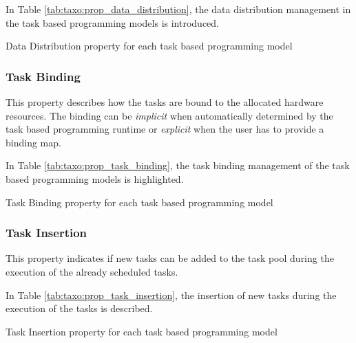 In Table \ref{tab:taxo:prop_data_distribution}, the data distribution management in the task based programming models is introduced.
\begin{table}[H]
	\caption{Data Distribution property for each task based programming model \label{tab:taxo:prop_data_distribution}}
	\centering
	\begin{multicols}{2}
		

		
	\end{multicols}
\end{table}

\subsubsection{Task Binding}
This property describes how the tasks are bound to the allocated hardware resources.
The binding can be \textit{implicit} when automatically determined by the task based programming runtime or \textit{explicit} when the user has to provide a binding map.

In Table \ref{tab:taxo:prop_task_binding}, the task binding management of the task based programming models is highlighted.
\begin{table}[H]
	\caption{Task Binding property for each task based programming model \label{tab:taxo:prop_task_binding}}
	\centering
	\begin{multicols}{2}
		

		
	\end{multicols}
\end{table}

\subsubsection{Task Insertion}
This property indicates if new tasks can be added to the task pool during the execution of the already scheduled tasks.

In Table \ref{tab:taxo:prop_task_insertion}, the insertion of new tasks during the execution of the tasks is described.
\begin{table}[H]
	\caption{Task Insertion property for each task based programming model \label{tab:taxo:prop_task_insertion}}
	\centering
	\begin{multicols}{2}
		

		
	\end{multicols}
\end{table}

